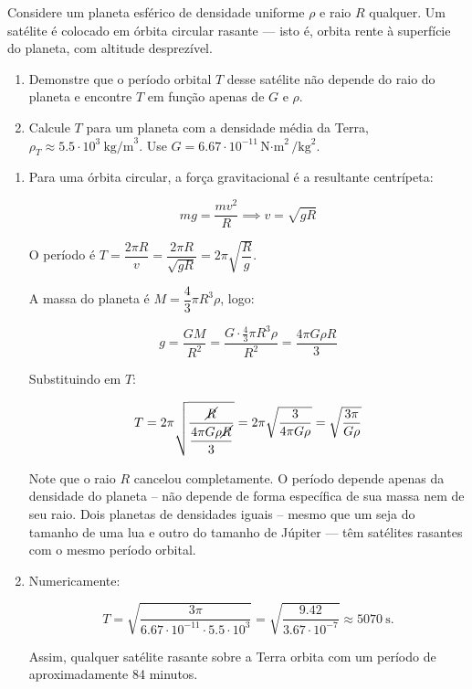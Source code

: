 \vspace{0.3cm}


\begin{exemplo}\label{exemplo_gravitacao_campogravitacionalex03}

Considere um planeta esférico de densidade uniforme $\rho$ e raio $R$ qualquer. Um satélite é colocado em órbita circular rasante --- isto é, orbita rente à superfície do planeta, com altitude desprezível.

\begin{enumerate}
    \item [a)] Demonstre que o período orbital $T$ desse satélite não depende
do raio do planeta e encontre $T$ em função apenas de $G$ e $\rho$.

\item[b)] Calcule $T$ para um planeta com a densidade média da Terra,
$\rho_T \approx 5.5 \cdot 10^3\ \text{kg/m}^3$.
Use $G = 6.67 \cdot 10^{-11} \text{N{$\cdot$}m}^2/\text{kg}^2$.

\end{enumerate}

\resolucao

\begin{enumerate}
    \item [a)] Para uma órbita circular, a força gravitacional é a resultante centrípeta:

$$mg = \frac{mv^2}{R} \implies v = \sqrt{gR}$$

O período é $T = \dfrac{2\pi R}{v} = \dfrac{2\pi R}{\sqrt{gR}} = 2\pi\sqrt{\dfrac{R}{g}}$.

A massa do planeta é $M = \dfrac{4}{3}\pi R^3 \rho$, logo:

$$g = \frac{GM}{R^2} = \frac{G \cdot \frac{4}{3}\pi R^3 \rho}{R^2} = \frac{4\pi G \rho R}{3}$$

Substituindo em $T$:

$$T = 2\pi\sqrt{\frac{\cancel R}{\dfrac{4\pi G\rho \cancel R}{3}}} = 2\pi\sqrt{\frac{3}{4\pi G\rho}}
= \sqrt{\frac{3\pi}{G\rho}}$$

Note que o raio $R$ cancelou completamente. O período depende apenas da densidade do
planeta -- não depende de forma específica de sua massa nem de seu raio. Dois planetas de densidades iguais -- mesmo que um seja do tamanho de uma lua e outro do tamanho de Júpiter --- têm satélites rasantes com o mesmo período orbital.

    \item[b)] Numericamente:

$$T = \sqrt{\frac{3\pi}{6.67 \cdot 10^{-11} \cdot 5.5 \cdot 10^3}}
= \sqrt{\frac{9.42}{3.67 \cdot 10^{-7}}}
\approx 5070\ \text{s} .$$

Assim, qualquer satélite rasante sobre a Terra orbita com um período de aproximadamente 84 minutos. 

    
\end{enumerate}

\end{exemplo}



